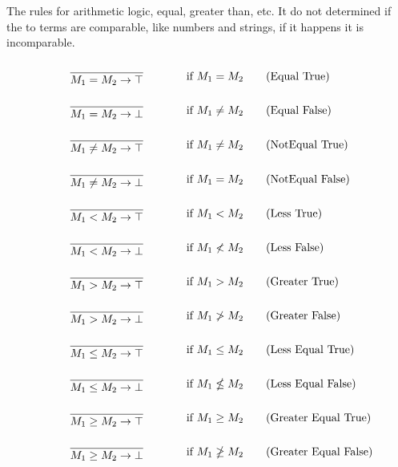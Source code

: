 The rules for arithmetic logic, equal, greater than, etc. It do not determined if the to terms are comparable, like numbers and strings, if it happens it is incomparable.



\begin{align*}
    \infrule{}{M_1 = M_2 \ra \top}& \text{if }M_1=M_2 \tag{Equal True}\\
    \infrule{}{M_1 = M_2 \ra \bot}& \text{if }M_1\neq M_2 \tag{Equal False}\\
    \infrule{}{M_1 \neq M_2 \ra \top}& \text{if }M_1\neq M_2 \tag{NotEqual True}\\
    \infrule{}{M_1 \neq M_2 \ra \bot}& \text{if }M_1= M_2 \tag{NotEqual False}\\
    \infrule{}{M_1 < M_2 \ra \top}& \text{if }M_1<M_2 \tag{Less True}\\
    \infrule{}{M_1 < M_2 \ra \bot}& \text{if }M_1\nless M_2 \tag{Less False}\\
    \infrule{}{M_1 > M_2 \ra \top}& \text{if }M_1>M_2 \tag{Greater True}\\
    \infrule{}{M_1 > M_2 \ra \bot}& \text{if }M_1\ngtr M_2 \tag{Greater False}\\
    \infrule{}{M_1 \leq M_2 \ra \top}& \text{if }M_1\leq M_2 \tag{Less Equal True}\\
    \infrule{}{M_1 \leq M_2 \ra \bot}& \text{if }M_1\nleq M_2 \tag{Less Equal False}\\
    \infrule{}{M_1 \geq M_2 \ra \top}& \text{if }M_1\geq M_2 \tag{Greater Equal True}\\
    \infrule{}{M_1 \geq M_2 \ra \bot}& \text{if }M_1\ngeq M_2 \tag{Greater Equal False}
\end{align*}


\FloatBarrier



